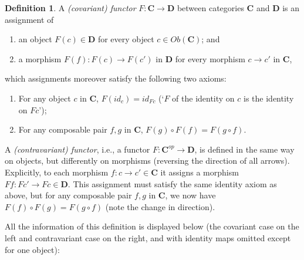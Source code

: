 \documentclass[11pt]{book}
\theoremstyle{definition}
\theoremstyle{definition}
\newtheorem{definition}{Definition}[section]
\theoremstyle{definition}
\theoremstyle{theorem}
\theoremstyle{definition}
\begin{document}
	\begin{definition}
		A \textit{(covariant) functor}  $F: \textbf{C} \rightarrow \textbf{D}$ between categories \textbf{C} and \textbf{D} is an assignment of 
		\begin{enumerate}
			\item an object $F(c) \in \textbf{D}$ for every object $c \in Ob(\textbf{C})$; and 
			\item a morphism $F(f): F(c) \rightarrow F(c')$ in $\textbf{D}$ for every morphism $c \rightarrow c'$ in $\textbf{C}$, 
		\end{enumerate}
	which assignments moreover satisfy the following two axioms: 
		\begin{enumerate}
			\item For any object $c$ in \textbf{C}, $F(id_c) = id_{Fc}$ (`$F$ of the identity on $c$ is the identity on $Fc$'); 
			\item For any composable pair $f,g$ in \textbf{C}, $F(g) \circ F(f) = F(g \circ f)$.
		\end{enumerate} 
		A \textit{(contravariant) functor}, i.e., a functor $F: \textbf{C}^{op} \rightarrow \textbf{D}$, is defined in the same way on objects, but differently on morphisms (reversing the direction of all arrows). Explicitly, to each morphism $f: c \rightarrow c' \in \textbf{C}$ it assigns a morphism $Ff: Fc' \rightarrow Fc \in \textbf{D}$. This assignment must satisfy the same identity axiom as above, but for any composable pair $f,g$ in \textbf{C}, we now have $F(f) \circ F(g) = F(g \circ f)$ (note the change in direction). \par 
		All the information of this definition is displayed below (the covariant case on the left and contravariant case on the right, and with identity maps omitted except for one object): 
		\par 
		\vspace*{0.5cm} 
	\small
	\end{definition} \noindent 
\end{document}
